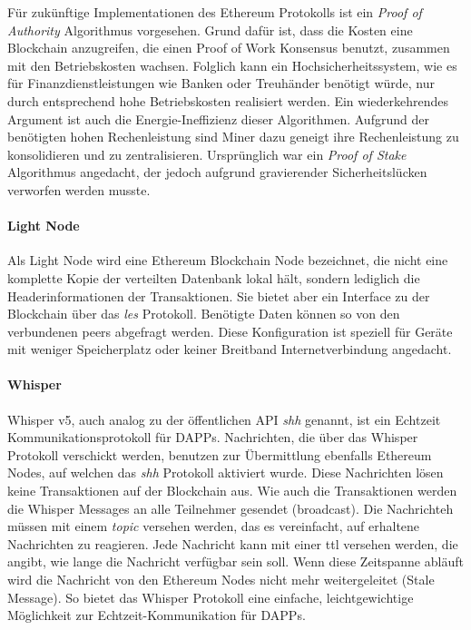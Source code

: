 Für zukünftige Implementationen des Ethereum Protokolls ist ein \emph{Proof of Authority} Algorithmus vorgesehen. Grund dafür ist, dass die Kosten eine Blockchain anzugreifen, die einen Proof of Work Konsensus benutzt, zusammen mit den Betriebskosten wachsen. Folglich kann ein Hochsicherheitssystem, wie es für Finanzdienstleistungen wie Banken oder Treuhänder benötigt würde, nur durch entsprechend hohe Betriebskosten realisiert werden. Ein wiederkehrendes Argument ist auch die Energie-Ineffizienz dieser Algorithmen. Aufgrund der benötigten hohen Rechenleistung sind Miner dazu geneigt ihre Rechenleistung zu konsolidieren und zu zentralisieren. Ursprünglich war ein \emph{Proof of Stake} Algorithmus angedacht, der jedoch aufgrund gravierender Sicherheitslücken verworfen werden musste.\cite{github.com/ethereum_poa,coinmanual.com/pos,bitcoin.it/pos,cost_nothing_kill_pos,tendermint.com/intro}\cite[{Frequently Asked Questions/What’s the future of Ethereum?}]{ethereum-homestead.readthedocs.io}

\paragraph{Light Node}
\label{para:Light_Node}

Als Light Node wird eine Ethereum Blockchain Node bezeichnet, die nicht eine komplette Kopie der verteilten Datenbank lokal hält, sondern lediglich die Headerinformationen der Transaktionen. Sie bietet aber ein Interface zu der Blockchain über das \emph{les} Protokoll. Benötigte Daten können so von den verbundenen peers abgefragt werden. Diese Konfiguration ist speziell für Geräte mit weniger Speicherplatz oder keiner Breitband Internetverbindung angedacht.\cite[]{go-ethereum}
\paragraph{Whisper}
\label{para:Whisper}
Whisper v5, auch analog zu der öffentlichen API \emph{shh} genannt, ist ein Echtzeit Kommunikationsprotokoll für \acrfull{DAPPs}. Nachrichten, die über das Whisper Protokoll verschickt werden, benutzen zur Übermittlung ebenfalls Ethereum Nodes, auf welchen das \emph{shh} Protokoll aktiviert wurde. Diese Nachrichten lösen keine Transaktionen auf der Blockchain aus. Wie auch die Transaktionen werden die Whisper Messages an alle Teilnehmer gesendet (broadcast). Die Nachrichteh müssen mit einem \emph{topic} versehen werden, das es vereinfacht, auf erhaltene Nachrichten zu reagieren. Jede Nachricht kann mit einer \acrfull{ttl} versehen werden, die angibt, wie lange die Nachricht verfügbar sein soll. Wenn diese Zeitspanne abläuft wird die Nachricht von den Ethereum Nodes nicht mehr weitergeleitet (Stale Message). So bietet das Whisper Protokoll eine einfache, leichtgewichtige Möglichkeit zur Echtzeit-Kommunikation für \acrshort{DAPPs}.\cite[Wiki/Whisper]{go-ethereum}

